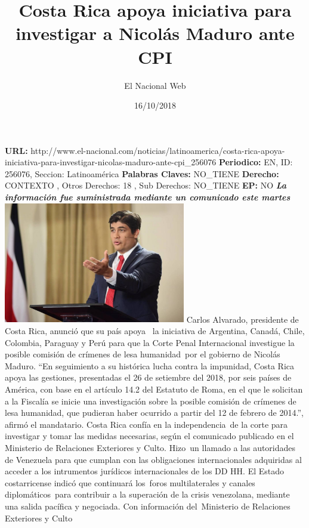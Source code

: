 \documentclass{article}%
\title{\textbf{Costa Rica apoya iniciativa para investigar a Nicolás Maduro ante CPI}}%
\author{El Nacional Web}%
\date{16/10/2018}%
\begin{document}
%
\normalsize%
\maketitle%
\textbf{URL: }%
http://www.el{-}nacional.com/noticias/latinoamerica/costa{-}rica{-}apoya{-}iniciativa{-}para{-}investigar{-}nicolas{-}maduro{-}ante{-}cpi\_256076\newline%
%
\textbf{Periodico: }%
EN, %
ID: %
256076, %
Seccion: %
Latinoamérica\newline%
%
\textbf{Palabras Claves: }%
NO\_TIENE\newline%
%
\textbf{Derecho: }%
CONTEXTO%
, Otros Derechos: %
18%
, Sub Derechos: %
NO\_TIENE%
\newline%
%
\textbf{EP: }%
NO\newline%
\newline%
%
\textbf{\textit{La información fue suministrada mediante un comunicado este martes}}%
\newline%
\newline%
%
\includegraphics[width=300px]{104.jpg}%
\newline%
%
Carlos Alvarado, presidente de Costa Rica, anunció que su país apoya~ la iniciativa de Argentina, Canadá, Chile, Colombia, Paraguay y Perú para que la Corte Penal Internacional investigue la posible comisión de crímenes de lesa humanidad~por el gobierno de Nicolás Maduro.%
\newline%
%
“En seguimiento a su histórica lucha contra la impunidad, Costa Rica apoya las gestiones, presentadas el 26 de setiembre del 2018, por seis países de América, con base en el artículo 14.2 del Estatuto de Roma, en el que le solicitan a la Fiscalía se inicie una investigación sobre la posible comisión de crímenes de lesa humanidad, que pudieran haber ocurrido a partir del 12 de febrero de 2014.”, afirmó el mandatario.%
\newline%
%
Costa Rica confía en la independencia~de la corte para investigar y tomar las medidas necesarias, según el comunicado publicado en el Ministerio de Relaciones Exteriores y Culto.%
\newline%
%
Hizo~un llamado a las autoridades de Venezuela para que cumplan con las obligaciones internacionales adquiridas al acceder a los intrumentos jurídicos internacionales de los DD HH.%
\newline%
%
El Estado costarricense indicó que continuará los~foros multilaterales y canales diplomáticos~para contribuir a la superación de la crisis venezolana, mediante una salida pacífica y negociada.%
\newline%
%
Con información del~Ministerio de Relaciones Exteriores y Culto%
\newline%
%
\end{document}

